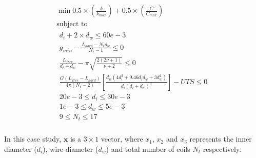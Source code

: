 \documentclass[10pt]{article}
\begin{document}
				\begin{equation}
					\begin{gathered}
	 					\min_{} 0.5 \times\left(\frac{k}{k_{max}}\right) + 0.5 \times (\frac{C}{C_{max}}) \\
	 					\mbox{subject to} \\%
						\begin{split}
							 d_{i} + 2 \times d_{w} \leq 60e-3\\
							 g_{min} - \frac{L_{hard} - N_{t}d_{w}}{N_{t}-1} \leq 0\\
							 \frac{L_{free}}{d_{i} + d_{w}} - \pi \sqrt{\frac{2(2 \nu + 1)}{\nu + 2}} \leq 0\\
							 \frac{G(L_{free} - L_{hard})}{4 \pi (N_{t} - 2) } \left[\frac{d_{w} (4d_{i}^{2} + 9.46d_{i} d_{w} + 3 d_{w}^{2})}{d_{i}(d_{i}+d_{w})^{3}}\right] - UTS \leq 0\\
							 20e-3 \leq d_{i} \leq 30e-3\\	 
							 1e-3 \leq d_{w} \leq 5e-3\\	 
							 9 \leq N_{t} \leq 17\\	 
						\end{split}
					\end{gathered}
					\label{eq:Case_1_Problem_Definition}	
				\end{equation}
	
    
\begin{flushleft}
In this case study, $\textbf{x}$ is a $3 \times 1$ vector, where $x_{1}$, $x_{2}$ and $x_{3}$ represents the inner diameter ($d_{i}$), wire diameter ($d_{w}$) and total number of coils $N_{t}$ respectively.

\end{flushleft}
    
\end{document}

